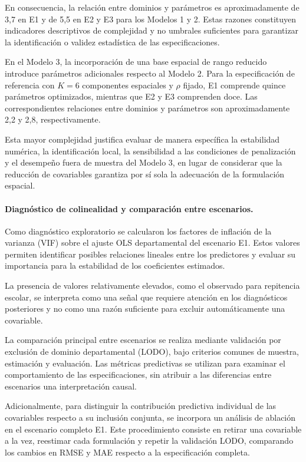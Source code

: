 En consecuencia, la relación entre dominios y parámetros es aproximadamente de 3,7 en E1 y de 5,5 en E2 y E3 para los Modelos 1 y 2. Estas razones constituyen indicadores descriptivos de complejidad y no umbrales suficientes para garantizar la identificación o validez estadística de las especificaciones.

En el Modelo 3, la incorporación de una base espacial de rango reducido introduce parámetros adicionales respecto al Modelo 2. Para la especificación de referencia con $K=6$ componentes espaciales y $\rho$ fijado, E1 comprende quince parámetros optimizados, mientras que E2 y E3 comprenden doce. Las correspondientes relaciones entre dominios y parámetros son aproximadamente 2,2 y 2,8, respectivamente.

Esta mayor complejidad justifica evaluar de manera específica la estabilidad numérica, la identificación local, la sensibilidad a las condiciones de penalización y el desempeño fuera de muestra del Modelo 3, en lugar de considerar que la reducción de covariables garantiza por sí sola la adecuación de la formulación espacial.

\paragraph{Diagnóstico de colinealidad y comparación entre escenarios.}

Como diagnóstico exploratorio se calcularon los factores de inflación de la varianza (VIF) sobre el ajuste OLS departamental del escenario E1. Estos valores permiten identificar posibles relaciones lineales entre los predictores y evaluar su importancia para la estabilidad de los coeficientes estimados.

La presencia de valores relativamente elevados, como el observado para repitencia escolar, se interpreta como una señal que requiere atención en los diagnósticos posteriores y no como una razón suficiente para excluir automáticamente una covariable.

La comparación principal entre escenarios se realiza mediante validación por exclusión de dominio departamental (LODO), bajo criterios comunes de muestra, estimación y evaluación. Las métricas predictivas se utilizan para examinar el comportamiento de las especificaciones, sin atribuir a las diferencias entre escenarios una interpretación causal.

Adicionalmente, para distinguir la contribución predictiva individual de las covariables respecto a su inclusión conjunta, se incorpora un análisis de ablación en el escenario completo E1. Este procedimiento consiste en retirar una covariable a la vez, reestimar cada formulación y repetir la validación LODO, comparando los cambios en RMSE y MAE respecto a la especificación completa.

